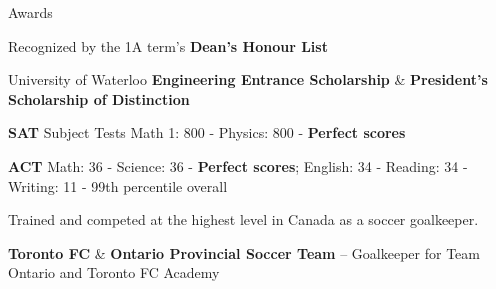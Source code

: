 \documentclass{resume} %
\begin{document}
\begin{rSection}{Awards}
\begin{rSubSubsection}{}{}{}{}

\item Recognized by the 1A term's \textbf{Dean's Honour List}
\item University of Waterloo \textbf{Engineering Entrance Scholarship} \& \textbf{President's Scholarship of Distinction} 
\item \textbf{SAT} Subject Tests Math 1: 800 - Physics: 800 -  \textbf{Perfect scores}
\item \textbf{ACT} Math: 36 - Science: 36 - \textbf{Perfect scores}; English: 34 - Reading: 34 - Writing: 11 - 99th percentile overall
\item Trained and competed at the highest level in Canada as a soccer goalkeeper.



\item \textbf{Toronto FC} \& \textbf{Ontario Provincial Soccer Team} -- Goalkeeper for Team Ontario and Toronto FC Academy  
\end{rSubSubsection}








\end{rSection}


\end{document}
